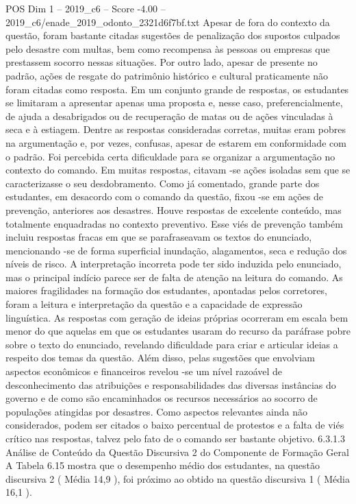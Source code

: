 \begin{textsample}{POS Dim 1 – 2019\_c6 – Score -4.00 – 2019\_c6/enade\_2019\_odonto\_2321d6f7bf.txt}
Apesar de fora do contexto da questão, foram bastante citadas sugestões de penalização dos supostos culpados pelo desastre com multas, bem como recompensa às pessoas ou empresas que prestassem socorro nessas situações.
Por outro lado, apesar de presente no padrão, ações de resgate do patrimônio histórico e cultural praticamente não foram citadas como resposta.
Em um conjunto grande de respostas, os estudantes se limitaram a apresentar apenas uma proposta e, nesse caso, preferencialmente, de ajuda a desabrigados ou de recuperação de matas ou de ações vinculadas à seca e à estiagem.
Dentre as respostas consideradas corretas, muitas eram pobres na argumentação e, por vezes, confusas, apesar de estarem em conformidade com o padrão.
Foi percebida certa dificuldade para se organizar a argumentação no contexto do comando.
Em muitas respostas, citavam -se ações isoladas sem que se caracterizasse o seu desdobramento.
Como já comentado, grande parte dos estudantes, em desacordo com o comando da questão, fixou -se em ações de prevenção, anteriores aos desastres.
Houve respostas de excelente conteúdo, mas totalmente enquadradas no contexto preventivo.
Esse viés de prevenção também incluiu respostas fracas em que se parafraseavam os textos do enunciado, mencionando -se de forma superficial inundação, alagamentos, seca e redução dos níveis de risco.
A interpretação incorreta pode ter sido induzida pelo enunciado, mas o principal indício parece ser de falta de atenção na leitura do comando.
As maiores fragilidades na formação dos estudantes, apontadas pelos corretores, foram a leitura e interpretação da questão e a capacidade de expressão linguística.
As respostas com geração de ideias próprias ocorreram em escala bem menor do que aquelas em que os estudantes usaram do recurso da paráfrase pobre sobre o texto do enunciado, revelando dificuldade para criar e articular ideias a respeito dos temas da questão.
Além disso, pelas sugestões que envolviam aspectos econômicos e financeiros revelou -se um nível razoável de desconhecimento das atribuições e responsabilidades das diversas instâncias do governo e de como são encaminhados os recursos necessários ao socorro de populações atingidas por desastres.
Como aspectos relevantes ainda não considerados, podem ser citados o baixo percentual de protestos e a falta de viés crítico nas respostas, talvez pelo fato de o comando ser bastante objetivo. 6.3.1.3 Análise de Conteúdo da Questão Discursiva 2 do Componente de Formação Geral A Tabela 6.15 mostra que o desempenho médio dos estudantes, na questão discursiva 2 ( Média 14,9 ), foi próximo ao obtido na questão discursiva 1 ( Média 16,1 ).

\end{textsample}
